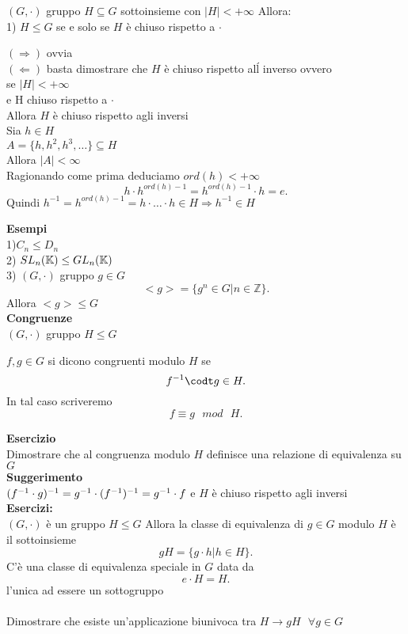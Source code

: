 \documentclass[12px]{article}
\begin{document}
{ \begin{prop}
 	$(G, \cdot)$ gruppo $H\subseteq G$ sottoinsieme con  $|H| < +\infty$ Allora:\\
	1)  $H \leq G$ se e solo se  $H$ è chiuso rispetto a $\cdot$
 \end{prop}
 \begin{dimo}
 	$( \Rightarrow )$ ovvia\\
	$ ( \Leftarrow )$ basta dimostrare che $H$ è chiuso rispetto alĺ inverso ovvero\\
	se $|H| < +\infty$\\
	e  H chiuso rispetto a  $\cdot$\\
	Allora  $H$ è chiuso rispetto agli inversi\\
	Sia $h\in H$\\
	$A = \lbrace h, h^2, h^3,\ldots\rbrace\subseteq H$\\
	Allora  $|A|<\infty $\\
	Ragionando come prima deduciamo  $ord(h) < + \infty$
	 \[
		 h\cdot h^{ord(h) -1} = h^{ord(h) -1}\cdot h = e
	.\] 
	Quindi $h^{-1} = h^{ord(h)-1} = h\cdot \ldots\cdot h\in H \Rightarrow h^{-1}\in H$
 \end{dimo}
 \textbf{Esempi}\\
 1)$C_n\leq D_n$\\
 2)  $SL_n(\mathbb{K})\leq GL_n(\mathbb{K})$\\
 3) $(G, \cdot)$ gruppo $g\in G$ 
 \[
 <g> = \lbrace g^n \in G| n\in \mathbb Z\rbrace
 .\] 
 Allora  $<g>\leq G$\\
  \textbf{Congruenze}\\
  $(G,\cdot)$ gruppo $H\leq G$\\
   \begin{defi}
  	$f,g\in G$ si dicono congruenti modulo  $H$ se 
	 \[
		 f^{-1}\codt g\in H
	.\] 
	In tal caso scriveremo 
	\[
	f\equiv g \ \ \ mod \ \ \ H
	.\] 
  \end{defi}
  \textbf{Esercizio}\\
  Dimostrare che al congruenza modulo $H$ definisce una relazione di equivalenza su  $G$\\
  \textbf{Suggerimento}\\
  $(f^{-1}\cdot g)^{-1} = g^{-1}\cdot (f^{-1})^{-1} = g^{-1}\cdot f\\$
  e $H$ è chiuso rispetto agli inversi\\
  \textbf{Esercizi:}\\
  $(G,\cdot)$ è un gruppo $H\leq G$ Allora la classe di equivalenza di $g\in G$ modulo  $H$ è il sottoinsieme
   \[
   gH = \lbrace g\cdot h | h\in H\rbrace
  .\] 
  C'è una classe di equivalenza speciale in $G$ data da 
  \[
  e\cdot H = H
  .\] 
  l'unica ad essere un sottogruppo\\
\hline \ \\
Dimostrare che esiste un'applicazione biunivoca tra $H \rightarrow gH\ \ \ \forall g\in G$
}
\end{document}
